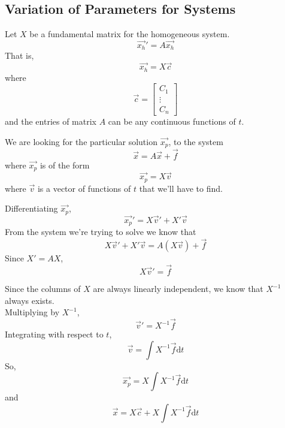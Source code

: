 \subsection{Variation of Parameters for Systems}
\noindent
Let $X$ be a fundamental matrix for the homogeneous system.
\begin{equation*}
	\vec{x_h}' = A\vec{x_h}
\end{equation*}
That is,
\begin{equation*}
	\vec{x_h} = X\vec{c}
\end{equation*}
where
\begin{equation*}
	\vec{c} = \begin{bmatrix}
	C_1 \\
	\vdots \\
	C_n
	\end{bmatrix}
\end{equation*}
and the entries of matrix $A$ can be any continuous functions of $t$.

\noindent
We are looking for the particular solution $\vec{x_p}$, to the system
\begin{equation*}
	\vec{x} = A\vec{x} + \vec{f}
\end{equation*}
where $\vec{x_p}$ is of the form
\begin{equation*}
	\vec{x_p} = X\vec{v}
\end{equation*}
where $\vec{v}$ is a vector of functions of $t$ that we'll have to find.

\noindent
Differentiating $\vec{x_p}$,
\begin{equation*}
	\vec{x_p}' = X\vec{v}' + X'\vec{v}
\end{equation*}
From the system we're trying to solve we know that
\begin{equation*}
	X\vec{v}' + X'\vec{v} = A(X\vec{v}) + \vec{f}
\end{equation*}
Since $X' = AX$,
\begin{equation*}
	X\vec{v}' = \vec{f}
\end{equation*}

\noindent
Since the columns of $X$ are always linearly independent, we know that $X^{-1}$ always exists.\\
Multiplying by $X^{-1}$,
\begin{equation*}
	\vec{v}' = X^{-1}\vec{f}
\end{equation*}
Integrating with respect to $t$,
\begin{equation*}
	\vec{v} = \int{X^{-1}\vec{f} \mathrm{d}t}
\end{equation*}
So,
\begin{equation*}
	\vec{x_p} = X\int{X^{-1}\vec{f} \mathrm{d}t}
\end{equation*}
and
\begin{equation*}
	\vec{x} = X\vec{c} + X\int{X^{-1}\vec{f} \mathrm{d}t}
\end{equation*}

\ifodd{}\fi